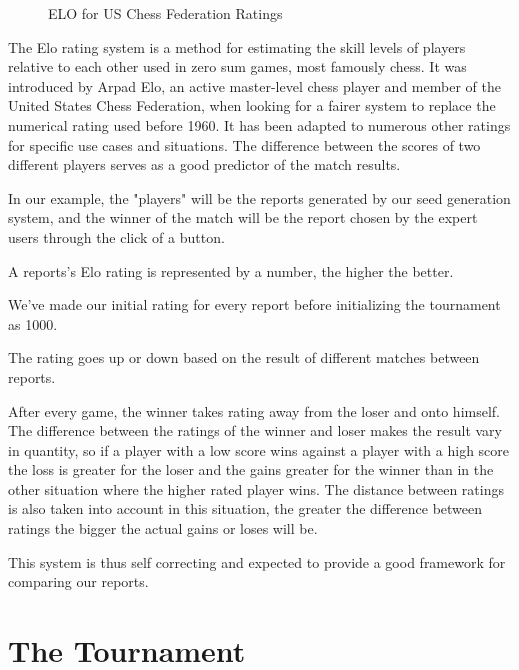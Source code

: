 \begin{figure}[!htb]
    \caption{\label{fig:my-label2} ELO for US Chess Federation Ratings  \cite{ELOUSCF}}
\end{figure}

The Elo rating system is a method for estimating the skill levels of players relative to each other used in zero sum games, most famously chess. 
It was introduced by Arpad Elo, an active master-level chess player and member of the United States Chess Federation, when looking for a fairer system to replace the numerical rating used before 1960.\cite{elo2008rating}
It has been adapted to numerous other ratings for specific use cases and situations.\cite{ELOFORMULA}
The difference between the scores of two different players serves as a good predictor of the match results.

In our example, the "players" will be the reports generated by our seed generation system, and the winner of the match will be the report chosen by the expert users through the click of a button.

A reports's Elo rating is represented by a number, the higher the better.

We've made our initial rating for every report before initializing the tournament as 1000.

The rating goes up or down based on the result of different matches between reports. 

After every game, the winner takes rating away from the loser and onto himself.
The difference between the ratings of the winner and loser makes the result vary in quantity, so if a player with a low score wins against a player with a high score the loss is greater for the loser and the gains greater for the winner than in the other situation where the higher rated player wins.
The distance between ratings is also taken into account in this situation, the greater the difference between ratings the bigger the actual gains or loses will be.

This system is thus self correcting and expected to provide a good framework for comparing our reports.

\section{The Tournament}
\label{cap4:sec:tourney}

